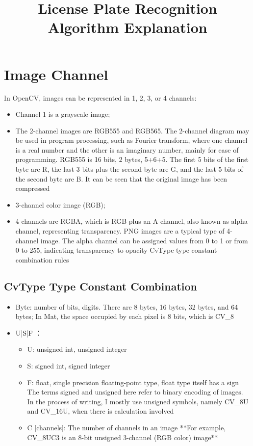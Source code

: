 \documentclass{article}
\title{License Plate Recognition Algorithm Explanation}
\begin{document}
	\maketitle
	
	\section{Image Channel}
	In OpenCV, images can be represented in 1, 2, 3, or 4 channels:
	\begin{itemize}
		\item Channel 1 is a grayscale image;
		\item The 2-channel images are RGB555 and RGB565. The 2-channel diagram may be used in program processing, such as Fourier transform, where one channel is a real number and the other is an imaginary number, mainly for ease of programming. RGB555 is 16 bits, 2 bytes, 5+6+5. The first 5 bits of the first byte are R, the last 3 bits plus the second byte are G, and the last 5 bits of the second byte are B. It can be seen that the original image has been compressed
		\item 3-channel color image (RGB);
		\item 4 channels are RGBA, which is RGB plus an A channel, also known as alpha channel, representing transparency. PNG images are a typical type of 4-channel image. The alpha channel can be assigned values from 0 to 1 or from 0 to 255, indicating transparency to opacity
		CvType type constant combination rules
	\end{itemize}
	
	\subsection{CvType Type Constant Combination}
	\begin{itemize}
		\item Byte: number of bits, digits. There are 8 bytes, 16 bytes, 32 bytes, and 64 bytes; In Mat, the space occupied by each pixel is 8 bits, which is CV\_8
		\item U|S|F ：
		\begin{itemize}
			\item U: unsigned int, unsigned integer
			\item S: signed int, signed integer
			\item F: float, single precision floating-point type, float type itself has a sign
			The terms signed and unsigned here refer to binary encoding of images. In the process of writing, I mostly use unsigned symbols, namely CV\_8U and CV\_16U, when there is calculation involved
			\item C [channels]: The number of channels in an image
			**For example, CV_8UC3 is an 8-bit unsigned 3-channel (RGB color) image**
		\end{itemize}
	\end{itemize}
	
\end{document}

